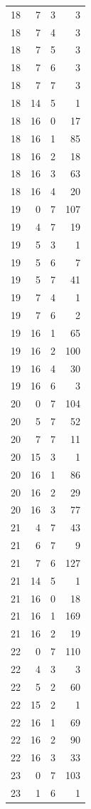 \begin{longtable}{rrrr}
18 & 7 & 3 & 3\\
18 & 7 & 4 & 3\\
18 & 7 & 5 & 3\\
18 & 7 & 6 & 3\\
18 & 7 & 7 & 3\\
18 & 14 & 5 & 1\\
18 & 16 & 0 & 17\\
18 & 16 & 1 & 85\\
18 & 16 & 2 & 18\\
18 & 16 & 3 & 63\\
18 & 16 & 4 & 20\\
19 & 0 & 7 & 107\\
19 & 4 & 7 & 19\\
19 & 5 & 3 & 1\\
19 & 5 & 6 & 7\\
19 & 5 & 7 & 41\\
19 & 7 & 4 & 1\\
19 & 7 & 6 & 2\\
19 & 16 & 1 & 65\\
19 & 16 & 2 & 100\\
19 & 16 & 4 & 30\\
19 & 16 & 6 & 3\\
20 & 0 & 7 & 104\\
20 & 5 & 7 & 52\\
20 & 7 & 7 & 11\\
20 & 15 & 3 & 1\\
20 & 16 & 1 & 86\\
20 & 16 & 2 & 29\\
20 & 16 & 3 & 77\\
21 & 4 & 7 & 43\\
21 & 6 & 7 & 9\\
21 & 7 & 6 & 127\\
21 & 14 & 5 & 1\\
21 & 16 & 0 & 18\\
21 & 16 & 1 & 169\\
21 & 16 & 2 & 19\\
22 & 0 & 7 & 110\\
22 & 4 & 3 & 3\\
22 & 5 & 2 & 60\\
22 & 15 & 2 & 1\\
22 & 16 & 1 & 69\\
22 & 16 & 2 & 90\\
22 & 16 & 3 & 33\\
23 & 0 & 7 & 103\\
23 & 1 & 6 & 1\\

\end{longtable}
